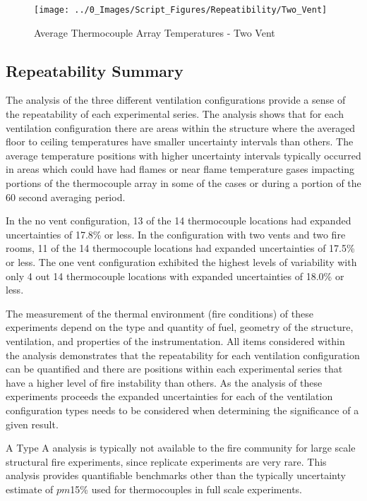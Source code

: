 \documentclass[12pt,oneside]{book}
\begin{document}
\begin{figure}[H]
\centering
\texttt{[image: ../0\_Images/Script\_Figures/Repeatibility/Two\_Vent]}
\caption{Average Thermocouple Array Temperatures - Two Vent}
\label{fig:repeat_Two_Vent}
\end{figure}

\subsection{Repeatability Summary}

The analysis of the three different ventilation configurations provide a sense of the repeatability of each experimental series.  The analysis shows that for each ventilation configuration there are areas within the structure where the averaged floor to ceiling temperatures have smaller uncertainty intervals than others.  The average temperature positions with higher uncertainty intervals typically occurred in areas which could have had flames or near flame temperature gases impacting portions of the thermocouple array in some of the cases or during a portion of the 60 second averaging period. 

In the no vent configuration, 13 of the 14 thermocouple locations had expanded uncertainties of 17.8\% or less.  In the configuration with two vents and two fire rooms, 11 of the 14 thermocouple locations had expanded uncertainties of 17.5\% or less.  The one vent configuration exhibited the highest levels of variability with only 4 out 14 thermocouple locations with expanded uncertainties of 18.0\% or less.

The measurement of the thermal environment (fire conditions) of these experiments depend on the type and quantity of fuel, geometry of the structure, ventilation, and properties of the instrumentation.  All items considered within the analysis demonstrates that the repeatability for each ventilation configuration can be quantified and there are positions within each experimental series that have a higher level of fire instability than others.  As the analysis of these experiments proceeds the expanded uncertainties for each of the ventilation configuration types needs to be considered when determining the significance of a given result.  

A Type A analysis is typically not available to the fire community for large scale structural fire experiments, since replicate experiments are very rare. This analysis provides quantifiable benchmarks other than the typically uncertainty estimate of $pm$15\% used for thermocouples in full scale experiments.       
\end{document}
